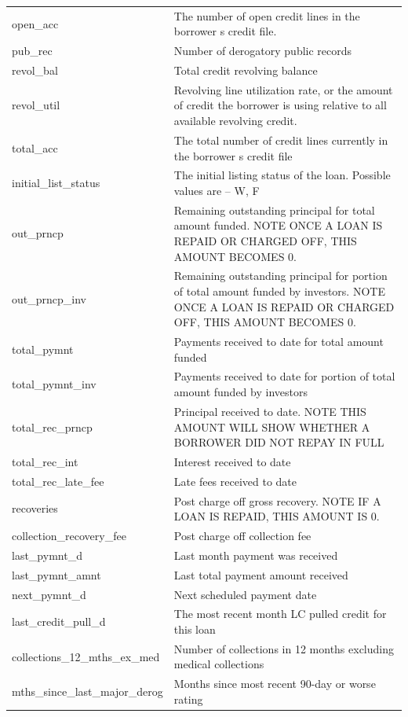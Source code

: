 \documentclass[11pt,]{report}
\begin{document}
\begin{longtable}[t]{>{\raggedright\arraybackslash}p{7cm}>{\raggedright\arraybackslash}p{7cm}}
open\_acc & The number of open credit lines in the borrower s credit file.\\
\addlinespace
pub\_rec & Number of derogatory public records\\
revol\_bal & Total credit revolving balance\\
revol\_util & Revolving line utilization rate, or the amount of credit the borrower is using relative to all available revolving credit.\\
total\_acc & The total number of credit lines currently in the borrower s credit file\\
initial\_list\_status & The initial listing status of the loan. Possible values are – W, F\\
\addlinespace
out\_prncp & Remaining outstanding principal for total amount funded. NOTE ONCE A LOAN IS REPAID OR CHARGED OFF, THIS AMOUNT BECOMES 0.\\
out\_prncp\_inv & Remaining outstanding principal for portion of total amount funded by investors. NOTE ONCE A LOAN IS REPAID OR CHARGED OFF, THIS AMOUNT BECOMES 0.\\
total\_pymnt & Payments received to date for total amount funded\\
total\_pymnt\_inv & Payments received to date for portion of total amount funded by investors\\
total\_rec\_prncp & Principal received to date. NOTE THIS AMOUNT WILL SHOW WHETHER A BORROWER DID NOT REPAY IN FULL\\
\addlinespace
total\_rec\_int & Interest received to date\\
total\_rec\_late\_fee & Late fees received to date\\
recoveries & Post charge off gross recovery. NOTE IF A LOAN IS REPAID, THIS AMOUNT IS 0.\\
collection\_recovery\_fee & Post charge off collection fee\\
last\_pymnt\_d & Last month payment was received\\
\addlinespace
last\_pymnt\_amnt & Last total payment amount received\\
next\_pymnt\_d & Next scheduled payment date\\
last\_credit\_pull\_d & The most recent month LC pulled credit for this loan\\
collections\_12\_mths\_ex\_med & Number of collections in 12 months excluding medical collections\\
mths\_since\_last\_major\_derog & Months since most recent 90-day or worse rating\\

\end{longtable}
\end{document}
